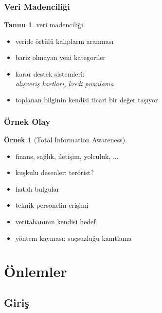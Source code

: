 \documentclass[dvipsnames]{beamer}
\theoremstyle{definition}
\newtheorem{tanim}[theorem]{Tanım}
\theoremstyle{example}
\newtheorem{ornek}[theorem]{Örnek}
\theoremstyle{plain}
\begin{document}
\begin{frame}
  \frametitle{Veri Madenciliği}

  \begin{tanim}
    \alert{veri madenciliği}

    \begin{itemize}
      \item veride örtülü kalıpların aranması
      \item bariz olmayan yeni kategoriler
    \end{itemize}
  \end{tanim}

  \pause
  \begin{itemize}
    \item karar destek sistemleri:\\
      \emph{alışveriş kartları, kredi puanlama}

    \pause
    \item toplanan bilginin kendisi ticari bir değer taşıyor
  \end{itemize}
\end{frame}

\begin{frame}
  \frametitle{Örnek Olay}

  \begin{ornek}[Total Information Awareness]
    \begin{itemize}
      \item finans, sağlık, iletişim, yolculuk, ...
      \item kuşkulu desenler: terörist?
    \end{itemize}

    \pause
    \begin{itemize}
      \item hatalı bulgular
      \item teknik personelin erişimi
      \item veritabanının kendisi hedef
      \item yöntem kayması: suçsuzluğu kanıtlama
    \end{itemize}
  \end{ornek}
\end{frame}

\section{Önlemler}

\subsection{Giriş}
\end{document}
